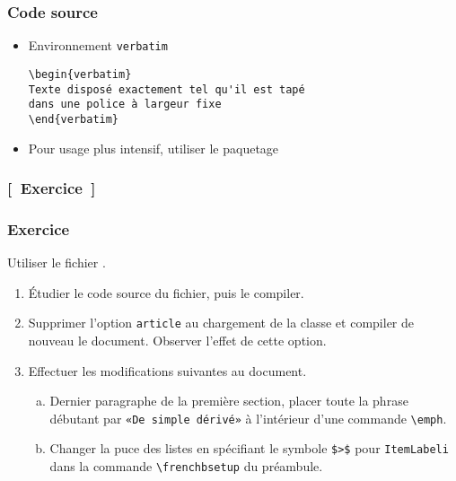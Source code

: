 \begin{frame}[fragile=singleslide]
  \frametitle{Code source}
  \begin{itemize}
  \item Environnement \texttt{verbatim}
\begin{lstlisting}
\begin{verbatim}
Texte disposé exactement tel qu'il est tapé
dans une police à largeur fixe
\end{verbatim}
\end{lstlisting}
  \item Pour usage plus intensif, utiliser le paquetage 
  \end{itemize}
\end{frame}

\subsubsection{[~Exercice~]}

\begin{frame}[fragile=singleslide]
  \frametitle{Exercice}

  Utiliser le fichier .

  \begin{enumerate}
  \item Étudier le code source du fichier, puis le compiler.
  \item Supprimer l'option \texttt{article} au chargement de la classe
    et compiler de nouveau le document. Observer l'effet de cette
    option.
  \item Effectuer les modifications suivantes au document.
    \begin{enumerate}[a)]
    \item Dernier paragraphe de la première section, placer toute la
      phrase débutant par \texttt{«De simple dérivé»} à l'intérieur
      d'une commande \texttt{{\textbackslash}emph}.
    \item Changer la puce des listes en spécifiant le symbole
      \texttt{\$>\$} pour \verb=ItemLabeli= dans la commande
      \verb=\frenchbsetup= du préambule.
    \end{enumerate}
  \end{enumerate}
\end{frame}

